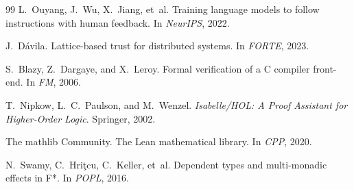 \documentclass[11pt]{article}
\begin{document}
\begin{thebibliography}{99}
L.~Ouyang, J.~Wu, X.~Jiang, et~al.
\newblock Training language models to follow instructions with human feedback.
\newblock In \emph{NeurIPS}, 2022.

J.~D{\'a}vila.
\newblock Lattice-based trust for distributed systems.
\newblock In \emph{FORTE}, 2023.

S.~Blazy, Z.~Dargaye, and X.~Leroy.
\newblock Formal verification of a {C} compiler front-end.
\newblock In \emph{FM}, 2006.

T.~Nipkow, L.~C.~Paulson, and M.~Wenzel.
\newblock \emph{Isabelle/HOL: A Proof Assistant for Higher-Order Logic}.
\newblock Springer, 2002.

The mathlib Community.
\newblock The {L}ean mathematical library.
\newblock In \emph{CPP}, 2020.

N.~Swamy, C.~Hri\c{t}cu, C.~Keller, et~al.
\newblock Dependent types and multi-monadic effects in {F*}.
\newblock In \emph{POPL}, 2016.

\end{thebibliography}
\end{document}
